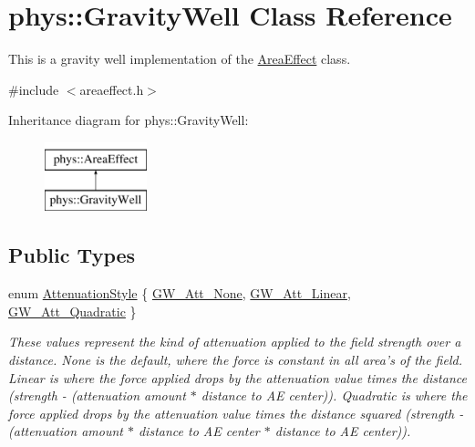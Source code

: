 \hypertarget{classphys_1_1GravityWell}{
\section{phys::GravityWell Class Reference}
\label{d6/d21/classphys_1_1GravityWell}
}


This is a gravity well implementation of the \hyperlink{classphys_1_1AreaEffect}{AreaEffect} class.  




{\ttfamily \#include $<$areaeffect.h$>$}

Inheritance diagram for phys::GravityWell:\begin{figure}[H]
\begin{center}
\leavevmode
\includegraphics[height=2.000000cm]{d6/d21/classphys_1_1GravityWell}
\end{center}
\end{figure}
\subsection*{Public Types}
\begin{DoxyCompactItemize}
\item 
enum \hyperlink{classphys_1_1GravityWell_a72d0da5f140b91bc364f2c46e7536e1f}{AttenuationStyle} \{ \hyperlink{classphys_1_1GravityWell_a72d0da5f140b91bc364f2c46e7536e1fa1429a2da7d5eccb56f773b12f67d2dc3}{GW\_\-Att\_\-None}, 
\hyperlink{classphys_1_1GravityWell_a72d0da5f140b91bc364f2c46e7536e1fa266647471ad2a0f86c272b8ff7ddd342}{GW\_\-Att\_\-Linear}, 
\hyperlink{classphys_1_1GravityWell_a72d0da5f140b91bc364f2c46e7536e1fac181ac3728c9280d52ccb355a5b9247f}{GW\_\-Att\_\-Quadratic}
 \}
\begin{DoxyCompactList}\small\item\em These values represent the kind of attenuation applied to the field strength over a distance. None is the default, where the force is constant in all area's of the field. Linear is where the force applied drops by the attenuation value times the distance (strength -\/ (attenuation amount $\ast$ distance to AE center)). Quadratic is where the force applied drops by the attenuation value times the distance squared (strength -\/ (attenuation amount $\ast$ distance to AE center $\ast$ distance to AE center)). \item\end{DoxyCompactList}\end{DoxyCompactItemize}
